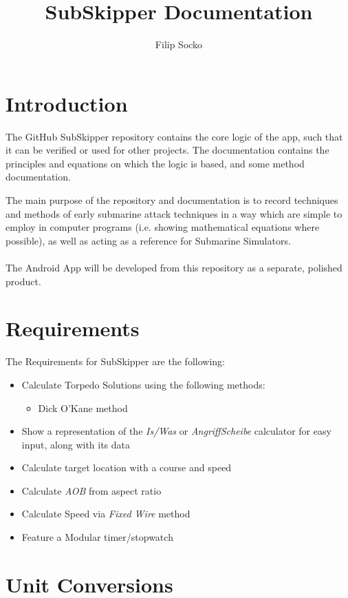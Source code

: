 \documentclass{article}
\author{Filip Socko}
\title{SubSkipper Documentation}
\begin{document}
\maketitle

\section{Introduction}
The GitHub SubSkipper repository contains the core logic of the app, such that it can be verified or used for other projects. The documentation contains the principles and equations on which the logic is based, and some method documentation.

The main purpose of the repository and documentation is to record techniques and methods of early submarine attack techniques in a way which are simple to employ in computer programs (i.e. showing mathematical equations where possible), as well as acting as a reference for Submarine Simulators.
\\ \\
The Android App will be developed from this repository as a separate, polished product.

\section{Requirements}
The Requirements for SubSkipper are the following:

\begin{itemize}
\item{Calculate Torpedo Solutions using the following methods:}
	\begin{itemize}
	\item{Dick O'Kane method}
	\end{itemize}
\item{Show a representation of the \emph{Is/Was} or \emph{AngriffScheibe} calculator for easy input, along with its data}
\item{Calculate target location with a course and speed}
\item{Calculate \emph{AOB} from aspect ratio}
\item{Calculate Speed via \emph{Fixed Wire} method}
\item{Feature a Modular timer/stopwatch}
\end{itemize}

\pagebreak
\section{Unit Conversions}
\end{document}
